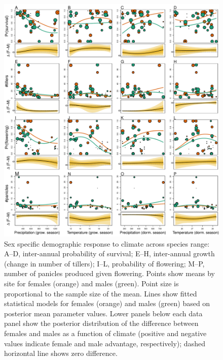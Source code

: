 \documentclass[12pt]{article}
\begin{document}
\begin{figure}[H]
  \begin{center}
    \includegraphics[width=0.95\linewidth]{Figures/vital_rates.pdf}
  \caption{Sex specific demographic response to climate across species range: A--D, inter-annual probability of survival; E--H, inter-annual growth (change in number of tillers); I--L, probability of flowering; M--P, number of panicles produced given flowering. 
  Points show means by site for females (orange) and males (green). 
  Point size is proportional to the sample size of the mean.
  Lines show fitted statistical models for females (orange) and males (green) based on posterior mean parameter values.
  Lower panels below each data panel show the posterior distribution of the difference between females and males as a function of climate (positive and negative values indicate female and male advantage, respectively); dashed horizontal line shows zero difference.}
  \label{fig:vital_rates}
  \end{center}
\end{figure}
\end{document}
